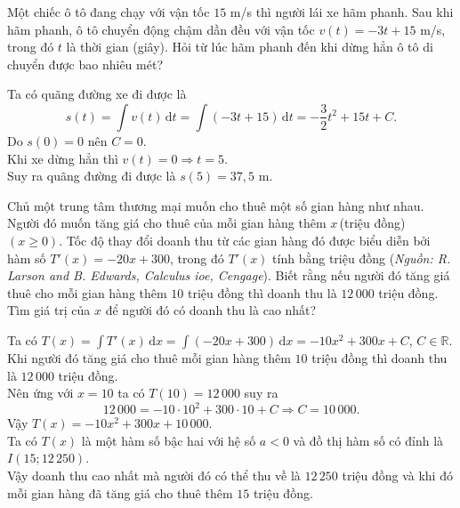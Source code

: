 \documentclass[12pt,aspectratio=169]{beamer}
\begin{document}
\begin{traloi}%
	Một chiếc ô tô đang chạy với vận tốc $15$ m/s thì người lái xe hãm phanh. Sau khi hãm phanh, ô tô chuyển động chậm dần đều với vận tốc $v(t)=-3t+15$ m/s, trong đó $t$ là thời gian (giây). Hỏi từ lúc hãm phanh đến khi dừng hẳn ô tô di chuyển được bao nhiêu mét?

	\begin{loigiai}
		Ta có quãng đường xe đi được là
		\[s\left(t \right)=\displaystyle\int{v(t)}\mathrm{\,d} t=\displaystyle\int{(-3t+15)}\mathrm{\,d}t=-\dfrac{3}{2}{t^2}+15t+C.\]
		Do $s(0)=0$ nên $C=0$.\\
		Khi xe dừng hẳn thì $v\left(t \right)=0\Rightarrow t=5$.\\
		Suy ra quãng đường đi được là $s(5)=37{,}5$ m.
	\end{loigiai}
\end{traloi}

\begin{traloi}%
	Chủ một trung tâm thương mại muốn cho thuê một số gian hàng như nhau. Người đó muốn tăng giá cho thuê của mỗi gian hàng thêm $x$\,(triệu đồng) $(x\ge 0)$. Tốc độ thay đổi doanh thu từ các gian hàng đó được biểu diễn bởi hàm số $T'(x)=-20x+300$, trong đó $T'(x)$ tính bằng triệu đồng (\textit{Nguồn: R. Larson and B. Edwards, Calculus ioe, Cengage}). Biết rằng nếu người đó tăng giá thuê cho mỗi gian hàng thêm $10$ triệu đồng thì doanh thu là $12\,000$ triệu đồng. Tìm giá trị của $x$ để người đó có doanh thu là cao nhất?

	\begin{loigiai}
		Ta có $T(x)=\displaystyle\int T'(x) \mathrm{\,d} x=\displaystyle\int(-20 x+300) \mathrm{\,d} x=-10 x^2+300 x+C$, $C \in \mathbb{R}$.\\
		Khi người đó tăng giá cho thuê mỗi gian hàng thêm $10$ triệu đồng thì doanh thu là $12\,000$ triệu đồng. \\
		Nên ứng với $x=10$ ta có $T(10)=12\,000$ suy ra
		$$12\,000=-10 \cdot 10^2+300 \cdot 10+C \Rightarrow C=10\,000.$$
		Vậy $T(x)=-10 x^2+300 x+10\,000$.\\
		Ta có $T(x)$ là một hàm số bậc hai với hệ số $a<0$ và đồ thị hàm số có đỉnh là $I(15;12\,250)$.\\
		Vậy doanh thu cao nhất mà người đó có thể thu về là $12\,250$ triệu đồng và khi đó mỗi gian hàng đã tăng giá cho thuê thêm $15$ triệu đồng.
	\end{loigiai}
\end{traloi}
\end{document}
